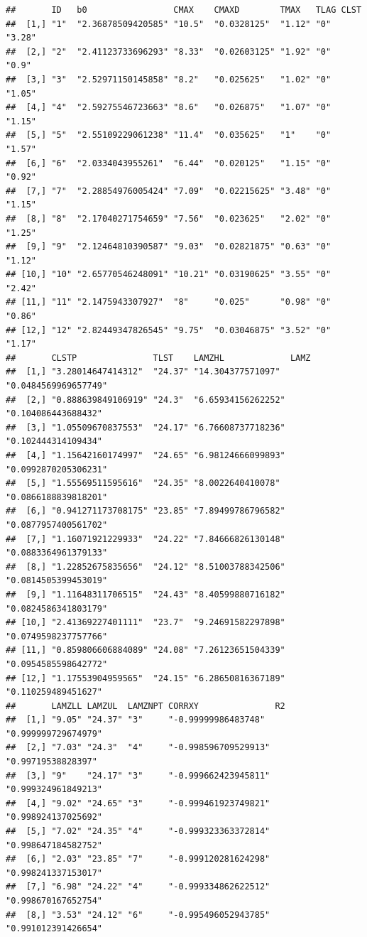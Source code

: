\documentclass[
  10pt,
]{krantz}
\begin{document}
\begin{verbatim}
##       ID   b0                 CMAX    CMAXD        TMAX   TLAG CLST  
##  [1,] "1"  "2.36878509420585" "10.5"  "0.0328125"  "1.12" "0"  "3.28"
##  [2,] "2"  "2.41123733696293" "8.33"  "0.02603125" "1.92" "0"  "0.9" 
##  [3,] "3"  "2.52971150145858" "8.2"   "0.025625"   "1.02" "0"  "1.05"
##  [4,] "4"  "2.59275546723663" "8.6"   "0.026875"   "1.07" "0"  "1.15"
##  [5,] "5"  "2.55109229061238" "11.4"  "0.035625"   "1"    "0"  "1.57"
##  [6,] "6"  "2.0334043955261"  "6.44"  "0.020125"   "1.15" "0"  "0.92"
##  [7,] "7"  "2.28854976005424" "7.09"  "0.02215625" "3.48" "0"  "1.15"
##  [8,] "8"  "2.17040271754659" "7.56"  "0.023625"   "2.02" "0"  "1.25"
##  [9,] "9"  "2.12464810390587" "9.03"  "0.02821875" "0.63" "0"  "1.12"
## [10,] "10" "2.65770546248091" "10.21" "0.03190625" "3.55" "0"  "2.42"
## [11,] "11" "2.1475943307927"  "8"     "0.025"      "0.98" "0"  "0.86"
## [12,] "12" "2.82449347826545" "9.75"  "0.03046875" "3.52" "0"  "1.17"
##       CLSTP               TLST    LAMZHL             LAMZ                
##  [1,] "3.28014647414312"  "24.37" "14.304377571097"  "0.0484569969657749"
##  [2,] "0.888639849106919" "24.3"  "6.65934156262252" "0.104086443688432" 
##  [3,] "1.05509670837553"  "24.17" "6.76608737718236" "0.102444314109434" 
##  [4,] "1.15642160174997"  "24.65" "6.98124666099893" "0.0992870205306231"
##  [5,] "1.55569511595616"  "24.35" "8.0022640410078"  "0.0866188839818201"
##  [6,] "0.941271173708175" "23.85" "7.89499786796582" "0.0877957400561702"
##  [7,] "1.16071921229933"  "24.22" "7.84666826130148" "0.0883364961379133"
##  [8,] "1.22852675835656"  "24.12" "8.51003788342506" "0.0814505399453019"
##  [9,] "1.11648311706515"  "24.43" "8.40599880716182" "0.0824586341803179"
## [10,] "2.41369227401111"  "23.7"  "9.24691582297898" "0.0749598237757766"
## [11,] "0.859806606884089" "24.08" "7.26123651504339" "0.0954585598642772"
## [12,] "1.17553904959565"  "24.15" "6.28650816367189" "0.110259489451627" 
##       LAMZLL LAMZUL  LAMZNPT CORRXY               R2                 
##  [1,] "9.05" "24.37" "3"     "-0.99999986483748"  "0.999999729674979"
##  [2,] "7.03" "24.3"  "4"     "-0.998596709529913" "0.99719538828397" 
##  [3,] "9"    "24.17" "3"     "-0.999662423945811" "0.999324961849213"
##  [4,] "9.02" "24.65" "3"     "-0.999461923749821" "0.998924137025692"
##  [5,] "7.02" "24.35" "4"     "-0.999323363372814" "0.998647184582752"
##  [6,] "2.03" "23.85" "7"     "-0.999120281624298" "0.998241337153017"
##  [7,] "6.98" "24.22" "4"     "-0.999334862622512" "0.998670167652754"
##  [8,] "3.53" "24.12" "6"     "-0.995496052943785" "0.991012391426654"

\end{verbatim}
\end{document}
